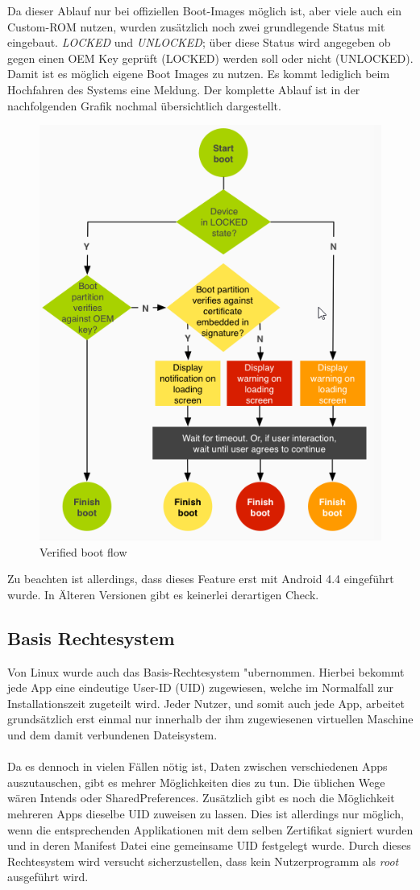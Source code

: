 	Da dieser Ablauf nur bei offiziellen Boot-Images möglich ist, aber viele auch ein Custom-ROM nutzen, wurden zusätzlich noch zwei grundlegende Status mit eingebaut. \textit{LOCKED} und \textit{UNLOCKED};  über diese Status wird angegeben ob gegen einen OEM Key geprüft (LOCKED) werden soll oder nicht (UNLOCKED). Damit ist es möglich eigene Boot Images zu nutzen. Es kommt lediglich beim Hochfahren des Systems eine Meldung.
	Der komplette Ablauf ist in der nachfolgenden Grafik nochmal übersichtlich dargestellt.
	\begin{figure}[h]
		\centering
		\includegraphics[width=0.6\linewidth, height=0.4\textheight]{android_pages/graphics/VerifiedBoot}
		\caption[Verified boot flow\protect\cite{VerifyingBoot}]{Verified boot flow\protect\cite{VerifyingBoot}}
		\label{fig:VerifiedBoot}
	\end{figure}

\begin{flushleft}
	Zu beachten ist allerdings, dass dieses Feature erst mit Android 4.4 eingeführt wurde. In Älteren Versionen gibt es keinerlei derartigen Check.
\end{flushleft}


	\subsection{Basis Rechtesystem}\label{sec:BasisRechteSystem}
	Von Linux wurde auch das Basis-Rechtesystem "ubernommen. Hierbei bekommt jede App eine eindeutige User-ID (UID) zugewiesen, welche im Normalfall zur Installationszeit zugeteilt wird. Jeder Nutzer, und somit auch jede App, arbeitet grundsätzlich erst einmal nur innerhalb der ihm zugewiesenen virtuellen Maschine und dem damit verbundenen Dateisystem.\\\\
	Da es dennoch in vielen Fällen nötig ist, Daten zwischen verschiedenen Apps auszutauschen, gibt es mehrer Möglichkeiten dies zu tun. Die üblichen Wege wären Intends oder SharedPreferences. Zusätzlich gibt es noch die Möglichkeit mehreren Apps dieselbe UID zuweisen zu lassen. Dies ist allerdings nur möglich, wenn die entsprechenden Applikationen mit dem selben Zertifikat signiert wurden und in deren Manifest Datei eine gemeinsame UID festgelegt wurde.
	Durch dieses Rechtesystem wird versucht sicherzustellen, dass kein Nutzerprogramm als \textit{root} ausgeführt wird.
	
